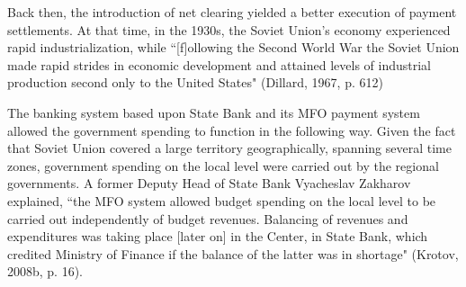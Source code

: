 Back then, the introduction of net clearing yielded a better execution of payment settlements. At that time, in the 1930s, the Soviet Union's economy experienced rapid industrialization, while ``[f]ollowing the Second World War the Soviet Union made rapid strides in economic development and attained levels of industrial production second only to the United States" (Dillard, 1967, p. 612)

The banking system based upon State Bank and its MFO payment system allowed the government spending to function in the following way. Given the fact that Soviet Union covered a large territory geographically, spanning several time zones, government spending on the local level were carried out by the regional governments. A former Deputy Head of State Bank Vyacheslav Zakharov explained, ``the MFO system allowed budget spending on the local level to be carried out independently of budget revenues. Balancing of revenues and expenditures was taking place [later on] in the Center, in State Bank, which credited Ministry of Finance if the balance of the latter was in shortage" (Krotov, 2008b, p. 16).

